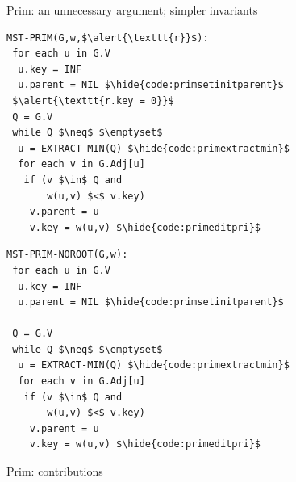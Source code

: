 \documentclass[usenames, xcolor=dvipsnames]{beamer}
\newcommand{\hide}[1]{}
\newcommand{\p}[1]{\ensuremath{\mathsf{#1}}} %
\begin{document}
\begin{frame}[fragile]{Prim: an unnecessary argument; simpler invariants}

\begin{minipage}{0.48\textwidth}
\begin{lstlisting}
MST-PRIM(G,w,$\alert{\texttt{r}}$):
 for each u in G.V
  u.key = INF
  u.parent = NIL $\hide{code:primsetinitparent}$
 $\alert{\texttt{r.key = 0}}$
 Q = G.V
 while Q $\neq$ $\emptyset$
  u = EXTRACT-MIN(Q) $\hide{code:primextractmin}$
  for each v in G.Adj[u]
   if (v $\in$ Q and
       w(u,v) $<$ v.key)
    v.parent = u
    v.key = w(u,v) $\hide{code:primeditpri}$
\end{lstlisting} \end{minipage}
\begin{minipage}{0.5\textwidth}
\begin{lstlisting}
MST-PRIM-NOROOT(G,w):
 for each u in G.V
  u.key = INF
  u.parent = NIL $\hide{code:primsetinitparent}$

 Q = G.V
 while Q $\neq$ $\emptyset$
  u = EXTRACT-MIN(Q) $\hide{code:primextractmin}$
  for each v in G.Adj[u]
   if (v $\in$ Q and
       w(u,v) $<$ v.key)
    v.parent = u
    v.key = w(u,v) $\hide{code:primeditpri}$
\end{lstlisting}
\end{minipage}
\end{frame}

\begin{frame}{Prim: contributions}


\bigskip


\bigskip



\bigskip





\end{frame}
\end{document}

